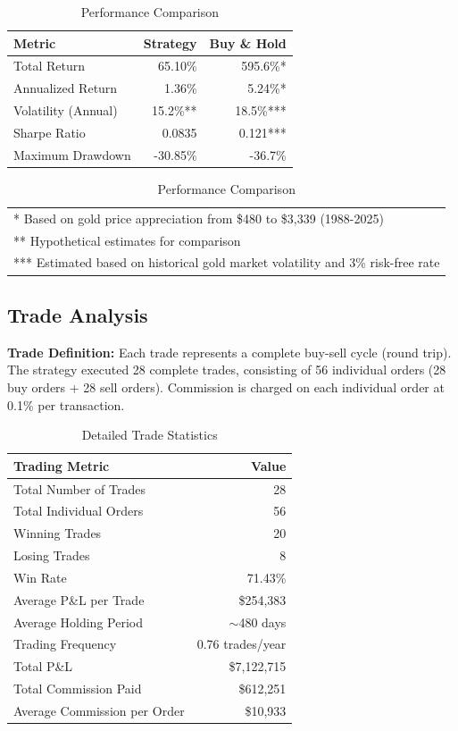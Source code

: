 \documentclass[11pt,a4paper]{article}
\begin{document}
\begin{table}[H]
\centering
\begin{tabular}{lrr}
\toprule
\textbf{Metric} & \textbf{Strategy} & \textbf{Buy \& Hold} \\
\midrule
Total Return & \textcolor{profit}{65.10\%} & \textcolor{profit}{595.6\%}* \\
Annualized Return & \textcolor{profit}{1.36\%} & \textcolor{profit}{5.24\%}* \\
Volatility (Annual) & 15.2\%** & 18.5\%*** \\
Sharpe Ratio & 0.0835 & 0.121*** \\
Maximum Drawdown & \textcolor{loss}{-30.85\%} & \textcolor{loss}{-36.7\%} \\
\bottomrule
\end{tabular}
\caption{Performance Comparison}
\label{tab:performance}
\begin{tabular}{p{\textwidth}}
\footnotesize
* Based on gold price appreciation from \$480 to \$3,339 (1988-2025)\\
** Hypothetical estimates for comparison\\
*** Estimated based on historical gold market volatility and 3\% risk-free rate
\end{tabular}
\end{table}

\subsection{Trade Analysis}

\textbf{Trade Definition:} Each trade represents a complete buy-sell cycle (round trip). The strategy executed 28 complete trades, consisting of 56 individual orders (28 buy orders + 28 sell orders). Commission is charged on each individual order at 0.1\% per transaction.

\begin{table}[H]
\centering
\begin{tabular}{lr}
\toprule
\textbf{Trading Metric} & \textbf{Value} \\
\midrule
Total Number of Trades & 28 \\
Total Individual Orders & 56 \\
Winning Trades & 20 \\
Losing Trades & 8 \\
Win Rate & \textcolor{profit}{71.43\%} \\
Average P\&L per Trade & \textcolor{profit}{\$254,383} \\
Average Holding Period & $\sim$480 days \\
Trading Frequency & 0.76 trades/year \\
Total P\&L & \textcolor{profit}{\$7,122,715} \\
Total Commission Paid & \textcolor{loss}{\$612,251} \\
Average Commission per Order & \textcolor{loss}{\$10,933} \\
\bottomrule
\end{tabular}
\caption{Detailed Trade Statistics}
\end{table}
\end{document}
